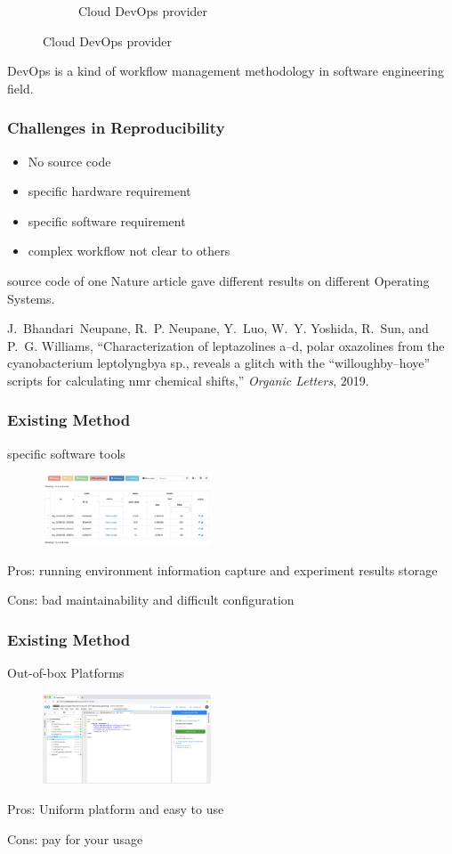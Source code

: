 \documentclass[notheorems]{beamer}
\begin{document}
\begin{frame}
\begin{figure}
\begin{subfigure}{0.33\textwidth}
		\caption{Cloud DevOps provider}
	\end{subfigure}
\end{figure}  
DevOps is a kind of workflow management methodology in software engineering field.
\end{frame}

\begin{frame}
\frametitle{Challenges in Reproducibility}
\begin{itemize}
\item No source code
\item specific hardware requirement
\item specific software requirement
\item complex workflow not clear to others
\end{itemize}
source code of one Nature article gave different results on different Operating Systems.

{\tiny J.~Bhandari~Neupane, R.~P. Neupane, Y.~Luo, W.~Y. Yoshida, R.~Sun, and P.~G.
  Williams, ``Characterization of leptazolines a--d, polar oxazolines from the
  cyanobacterium leptolyngbya sp., reveals a glitch with the
  “willoughby--hoye” scripts for calculating nmr chemical shifts,''
  \emph{Organic Letters}, 2019.
 } 
 
\end{frame}

\begin{frame}
\frametitle{Existing Method}
specific software tools
\begin{figure}
\includegraphics[width=5cm]{pic/fitlog_table.png}
\end{figure}
Pros: running environment information capture and experiment results storage

Cons: bad maintainability and difficult configuration
\end{frame}

\begin{frame}
	\frametitle{Existing Method}
Out-of-box Platforms
\begin{figure}
\includegraphics[width=5cm]{pic/code_ocean.jpeg}
\end{figure}
Pros: Uniform platform and easy to use

Cons: pay for your usage
\end{frame}
\end{document}
